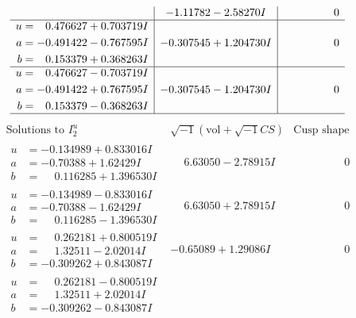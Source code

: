 \documentclass[1p]{elsarticle_modified}
\theoremstyle{definition}
\newcommand{\I}{\sqrt{-1}}
\begin{document}
$$\begin{array}{c|c|c}
 & -1.11782 - 2.58270 I & \phantom{-0.000000 } 0 \\ \hline\begin{aligned}
u &= \phantom{-}0.476627 + 0.703719 I \\
a &= -0.491422 - 0.767595 I \\
b &= \phantom{-}0.153379 + 0.368263 I\end{aligned}
 & -0.307545 + 1.204730 I & \phantom{-0.000000 } 0 \\ \hline\begin{aligned}
u &= \phantom{-}0.476627 - 0.703719 I \\
a &= -0.491422 + 0.767595 I \\
b &= \phantom{-}0.153379 - 0.368263 I\end{aligned}
 & -0.307545 - 1.204730 I & \phantom{-0.000000 } 0\\
 \hline 
 \end{array}$$\newpage$$\begin{array}{c|c|c}  
\text{Solutions to }I^u_{2}& \I (\text{vol} + \sqrt{-1}CS) & \text{Cusp shape}\\
 \hline 
\begin{aligned}
u &= -0.134989 + 0.833016 I \\
a &= -0.70388 + 1.62429 I \\
b &= \phantom{-}0.116285 + 1.396530 I\end{aligned}
 & \phantom{-}6.63050 - 2.78915 I & \phantom{-0.000000 } 0 \\ \hline\begin{aligned}
u &= -0.134989 - 0.833016 I \\
a &= -0.70388 - 1.62429 I \\
b &= \phantom{-}0.116285 - 1.396530 I\end{aligned}
 & \phantom{-}6.63050 + 2.78915 I & \phantom{-0.000000 } 0 \\ \hline\begin{aligned}
u &= \phantom{-}0.262181 + 0.800519 I \\
a &= \phantom{-}1.32511 - 2.02014 I \\
b &= -0.309262 + 0.843087 I\end{aligned}
 & -0.65089 + 1.29086 I & \phantom{-0.000000 } 0 \\ \hline\begin{aligned}
u &= \phantom{-}0.262181 - 0.800519 I \\
a &= \phantom{-}1.32511 + 2.02014 I \\
b &= -0.309262 - 0.843087 I\end{aligned}

\end{array}$$
\end{document}

